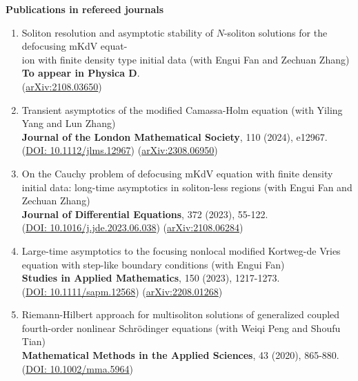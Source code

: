 \documentclass[letterpaper,11pt,UTF8]{article}
\begin{document}
\large\textbf{Publications in refereed journals}
\begin{flushleft}
    \begin{enumerate}[1.]
    \item Soliton resolution and asymptotic stability of $N$-soliton solutions for the defocusing mKdV equat-\\ion with finite density type initial data (with Engui Fan and Zechuan Zhang)\\ 
    {\bf To appear in Physica D}.\\
    (\href{https://arxiv.org/abs/2108.03650}{arXiv:2108.03650})

    \item Transient asymptotics of the modified Camassa-Holm equation (with Yiling Yang and Lun Zhang) \\
    {\bf Journal of the London Mathematical Society}, 110 (2024), e12967. \\
    (\href{https://londmathsoc.onlinelibrary.wiley.com/doi/10.1112/jlms.12967}{DOI: 10.1112/jlms.12967}) (\href{https://arxiv.org/abs/2308.06950}{arXiv:2308.06950})

    \item On the Cauchy problem of defocusing mKdV equation with finite density initial data: long-time asymptotics in soliton-less regions (with Engui Fan and Zechuan Zhang)\\
    {\bf Journal of Differential Equations}, 372 (2023), 55-122.\\
    (\href{https://www.sciencedirect.com/science/article/pii/S002203962300445X?via%3Dihub}{DOI: 10.1016/j.jde.2023.06.038}) (\href{https://arxiv.org/abs/2108.06284}{arXiv:2108.06284})

    \item Large-time asymptotics to the focusing nonlocal modified Kortweg-de Vries equation with step-like boundary conditions (with Engui Fan)\\
    {\bf Studies in Applied Mathematics}, 150 (2023), 1217-1273. \\
    (\href{https://onlinelibrary.wiley.com/doi/10.1111/sapm.12568}{DOI: 10.1111/sapm.12568}) (\href{https://arxiv.org/abs/2208.01268}{arXiv:2208.01268})

    \item Riemann-Hilbert approach for multisoliton solutions of generalized coupled fourth-order nonlinear Schr\"odinger equations
    (with Weiqi Peng and Shoufu Tian)\\
    {\bf Mathematical Methods in the Applied Sciences}, 43 (2020), 865-880.\\
    (\href{https://onlinelibrary.wiley.com/doi/10.1002/mma.5964}{DOI: 10.1002/mma.5964})
    \end{enumerate}
\end{flushleft}
\end{document}
